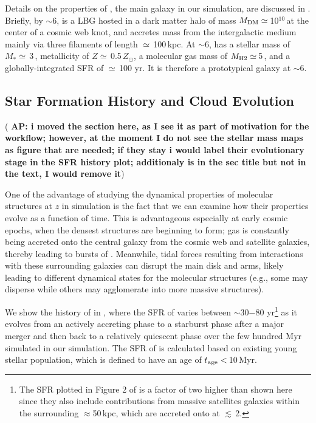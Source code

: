 \documentclass[apj]{emulateapj} %
\newcommand{\AP}[1]{({\bf \color{apcolor} AP: #1})}
\begin{document}
Details on the properties of \flower, the main galaxy in our simulation, are discussed in \citet{Pallottini17b}.
%
Briefly, by \z$\sim$6, \flower is a LBG hosted in a dark matter halo of mass $M_{\rm DM}\simeq$\,10$^{10}$\,\Msun at the center of a cosmic web knot, and accretes mass from the intergalactic medium mainly via three filaments of length $\simeq$\,100\,kpc. At \z$\sim$6, \flower has a stellar mass of $M_*\simeq$\,3\,\Msun, metallicity of $Z\simeq$\,0.5\,$Z_{\odot}$, a molecular gas mass of $M_{\rm H2}\simeq$\,5\,\Msun, and a globally-integrated SFR of $\simeq$\,100\,\Msun\,yr\pmOne. It is therefore a prototypical galaxy at \z$\sim$6.


\subsection{Star Formation History and Cloud Evolution} \label{sec:sfh}

\AP{i moved the section here, as I see it as part of motivation for the workflow; however, at the moment I do not see the stellar mass maps as figure that are needed; if they stay i would label their evolutionary stage in the SFR history plot; additionaly \quotes{cloud evolutiion} is in the sec title but not in the text, I would remove it}

One of the advantage of studying the dynamical properties of molecular structures at
$z$ in simulation is the fact that we can examine how their properties evolve
as a function of time.
This is advantageous especially at early cosmic epochs,
when the densest structures are beginning to form;
gas is constantly being accreted onto the central galaxy from the cosmic web and
satellite galaxies, thereby leading to bursts of \SF.
Meanwhile, tidal forces resulting from interactions with these surrounding
galaxies can disrupt the main disk and arms, likely leading to different dynamical states
for the molecular structures (e.g., some may disperse while others may agglomerate into more massive
structures). %

We show the \SF history of \flower in , where
the SFR of \flower varies between $\sim$30$-$80\,\Msun\,yr\pmOne\footnote{
The SFR plotted in Figure 2 of \citet{Pallottini17b}
is a factor of two higher than shown here since they also include contributions from
massive satellites galaxies within the surrounding $\approx$50\,kpc, which
are accreted onto \flower at \z$\lesssim$\,2.}
as it evolves from an actively accreting phase to
a starburst phase after a major merger and then back to a relatively quiescent phase
over the few hundred Myr simulated in our simulation.
The SFR of \flower is calculated based on existing young stellar population, which is
defined to have an age of $t_{\rm age}<$\,10\,Myr.
\end{document}
